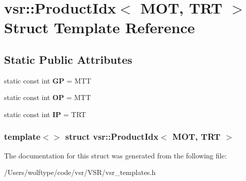 \hypertarget{structvsr_1_1_product_idx_3_01_m_o_t_00_01_t_r_t_01_4}{\section{vsr\-:\-:Product\-Idx$<$ M\-O\-T, T\-R\-T $>$ Struct Template Reference}
\label{structvsr_1_1_product_idx_3_01_m_o_t_00_01_t_r_t_01_4}
}
\subsection*{Static Public Attributes}
\begin{DoxyCompactItemize}
\item 
\hypertarget{structvsr_1_1_product_idx_3_01_m_o_t_00_01_t_r_t_01_4_ab5dccf67f48689207cf1a0c8baf4f5de}{static const int {\bfseries G\-P} = M\-T\-T}\label{structvsr_1_1_product_idx_3_01_m_o_t_00_01_t_r_t_01_4_ab5dccf67f48689207cf1a0c8baf4f5de}

\item 
\hypertarget{structvsr_1_1_product_idx_3_01_m_o_t_00_01_t_r_t_01_4_a74ea8f5f9839669b0bc09312dbaf2ae9}{static const int {\bfseries O\-P} = M\-T\-T}\label{structvsr_1_1_product_idx_3_01_m_o_t_00_01_t_r_t_01_4_a74ea8f5f9839669b0bc09312dbaf2ae9}

\item 
\hypertarget{structvsr_1_1_product_idx_3_01_m_o_t_00_01_t_r_t_01_4_a357db7e8341ab0649205bf3efd57c4dd}{static const int {\bfseries I\-P} = T\-R\-T}\label{structvsr_1_1_product_idx_3_01_m_o_t_00_01_t_r_t_01_4_a357db7e8341ab0649205bf3efd57c4dd}

\end{DoxyCompactItemize}
\subsubsection*{template$<$$>$ struct vsr\-::\-Product\-Idx$<$ M\-O\-T, T\-R\-T $>$}



The documentation for this struct was generated from the following file\-:\begin{DoxyCompactItemize}
\item 
/\-Users/wolftype/code/vsr/\-V\-S\-R/vsr\-\_\-templates.\-h\end{DoxyCompactItemize}
